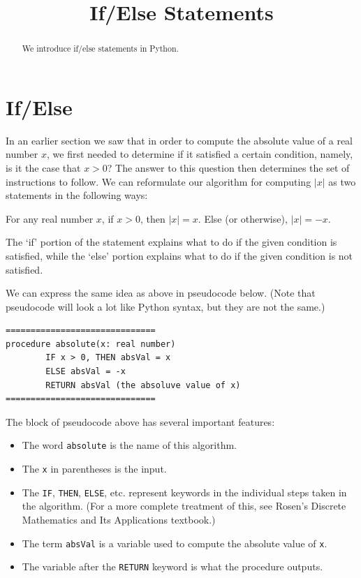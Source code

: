 \documentclass{ximera}
\title{If/Else Statements}
\begin{document}
  
\lstset{language=Python,frame=tb}
\begin{abstract}  
We introduce if/else statements in Python.
\end{abstract}  
\maketitle

\section{If/Else}

In an earlier section we saw that in order to compute the absolute value of a real number $x$, we first needed to determine if it satisfied a certain condition, namely, is it the case that $x>0$? The answer to this question then determines the set of instructions to follow. We can reformulate our algorithm for computing $|x|$ as two statements in the following ways:

For any real number $x$, if $x>0$, then $|x|=x$. Else (or otherwise), $|x|=-x$.

The `if' portion of the statement explains what to do if the given condition is satisfied, while the `else' portion explains what to do if the given condition is not satisfied.

We can express the same idea as above in pseudocode below. (Note that pseudocode will look a lot like Python syntax, but they are not the same.)

\begin{verbatim}
==============================
procedure absolute(x: real number)
        IF x > 0, THEN absVal = x
        ELSE absVal = -x
        RETURN absVal (the absoluve value of x)
==============================
\end{verbatim}

The block of pseudocode above has several important features:

\begin{itemize}
	\item The word \verb|absolute| is the name of this algorithm.
	\item The \verb|x| in parentheses is the input.
	\item The \verb|IF|, \verb|THEN|, \verb|ELSE|, etc. represent keywords in the individual steps taken in the algorithm. (For a more complete treatment of this, see Rosen's Discrete Mathematics and Its Applications textbook.)
	\item The term \verb|absVal| is a variable used to compute the absolute value of \verb|x|.
	\item The variable after the \verb|RETURN| keyword is what the procedure outputs. 
\end{itemize}
\end{document}
